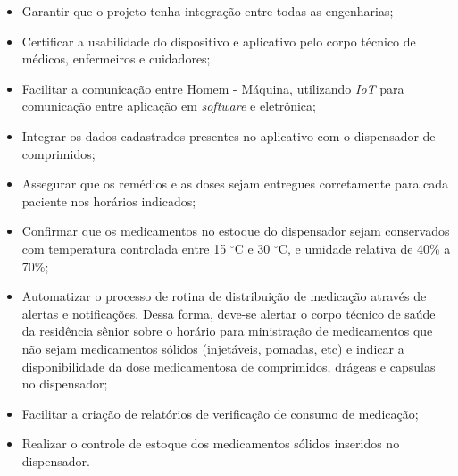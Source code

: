 \begin{itemize}
\item Garantir que o projeto tenha integração entre todas as engenharias;
\item Certificar a usabilidade do dispositivo e aplicativo pelo corpo técnico de médicos, enfermeiros e cuidadores;
\item Facilitar a comunicação entre Homem - Máquina, utilizando \textit{IoT} para comunicação entre aplicação em \textit{software} e eletrônica; 
\item Integrar os dados cadastrados presentes no aplicativo com o dispensador de comprimidos;
\item Assegurar que os remédios e as doses sejam entregues corretamente para cada paciente nos horários indicados;
\item Confirmar que os medicamentos no estoque do dispensador sejam conservados com temperatura controlada entre 15 $^\circ$C e 30 $^\circ$C, e umidade relativa de 40\% a 70\%;
\item Automatizar o processo de rotina de distribuição de medicação através de alertas e notificações. Dessa forma, deve-se alertar o corpo técnico de saúde da residência sênior sobre o horário para ministração de medicamentos que não sejam medicamentos sólidos (injetáveis, pomadas, etc) e indicar a disponibilidade da dose medicamentosa de comprimidos, drágeas e capsulas no dispensador;
\item Facilitar a criação de relatórios de verificação de consumo de medicação;
\item Realizar o controle de estoque dos medicamentos sólidos inseridos no dispensador.

\end{itemize}







